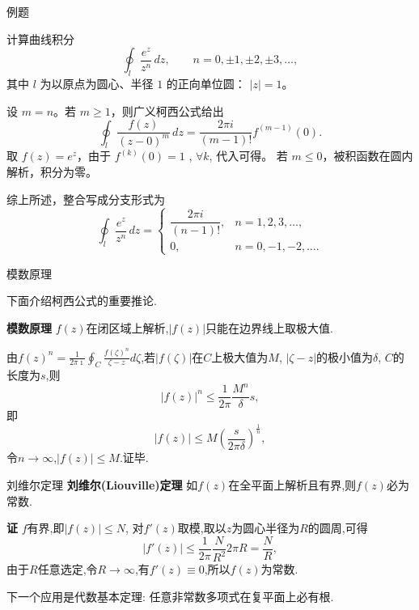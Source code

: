 \documentclass[fontset=windows, chinese, 10pt]{beamer}
\begin{document}




\begin{frame}{例题}
\small
\begin{example}
计算曲线积分
\[
\oint_{l}\frac{e^{z}}{z^{n}}\,dz,\qquad n=0,\pm1,\pm2,\pm3,\dots,
\]
其中 \(l\) 为以原点为圆心、半径 \(1\) 的正向单位圆： \(|z|=1\)。
\end{example}
{
\begin{solution}
设 \(m=n\)。若 \(m\ge1\)，则广义柯西公式给出
\[
\oint_{l}\frac{f(z)}{(z-0)^{m}}\,dz=\frac{2\pi i}{(m-1)!}f^{(m-1)}(0).
\]
取 \(f(z)=e^{z}\)，由于 \(f^{(k)}(0)=1\) , $\forall k$,  代入可得。
若 \(m\le0\)，被积函数在圆内解析，积分为零。

综上所述，整合写成分支形式为
\[
\oint_{l}\frac{e^{z}}{z^{n}}\,dz=
\begin{cases}
\dfrac{2\pi i}{(n-1)!}, & n=1,2,3,\dots,\\[6pt]
0, & n=0,-1,-2,\dots .
\end{cases}
\]
\end{solution}

}
\end{frame}


\begin{frame}{模数原理}

下面介绍柯西公式的重要推论.

\textbf{模数原理} $f(z)$在闭区域上解析,$|f(z)|$只能在边界线上取极大值.

由$f(z)^n = \frac{1}{2\pi \imath} \oint_C \frac{f(\zeta)^n}{\zeta - z} d \zeta$,若$|f(\zeta)|$在$C$上极大值为$M$,
$|\zeta - z|$的极小值为$\delta$, $C$的长度为$s$,则
\[
  |f(z)|^n \leq \frac{1}{2\pi} \frac{M^n}{\delta} s  ,
\]
即
\[
    |f(z)| \leq M \left( \frac{s}{2\pi \delta} \right)^{\frac{1}{n}},
\]
令$n\to \infty$,$|f(z)| \leq M$.证毕.

  \end{frame}
  
  \begin{frame}{刘维尔定理}
    \small
   \textbf{刘维尔(Liouville)定理} \quad 如$f(z)$在全平面上解析且有界,则$f(z)$必为常数.

\textbf{证} \quad $f$有界,即$|f(z)| \leq N$, 对$f'(z)$取模,取以$z$为圆心半径为$R$的圆周,可得
\[
  |f'(z)| \leq \frac{1}{2\pi} \frac{N} {R^2} 2\pi R = \frac{N}{R},
\]
由于$R$任意选定,令$R\to \infty$,有$f'(z) \equiv 0$,所以$f(z)$为常数.

下一个应用是代数基本定理: 任意非常数多项式在复平面上必有根.
\end{frame}
\end{document}

